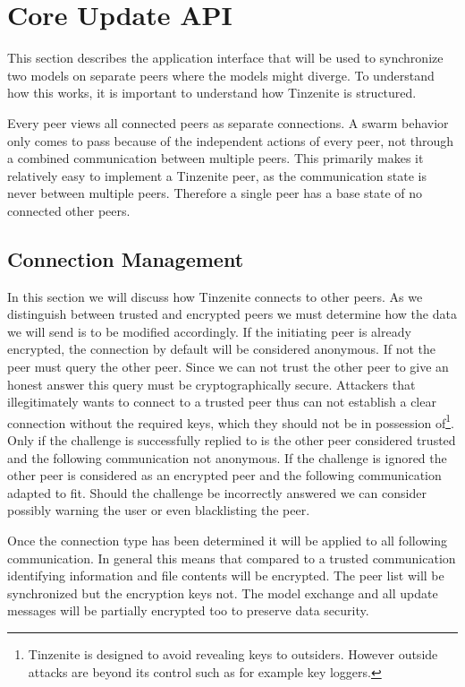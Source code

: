 \section{Core Update API}
\label{sec:Core Update API}

This section describes the application interface that will be used to synchronize two models on separate peers where the models might diverge.
To understand how this works, it is important to understand how Tinzenite is structured.

Every peer views all connected peers as separate connections.
A swarm behavior only comes to pass because of the independent actions of every peer, not through a combined communication between multiple peers.
This primarily makes it relatively easy to implement a Tinzenite peer, as the communication state is never between multiple peers.
Therefore a single peer has a base state of no connected other peers.

\subsection{Connection Management}
\label{sec:conn_management}

In this section we will discuss how Tinzenite connects to other peers.
As we distinguish between trusted and encrypted peers we must determine how the data we will send is to be modified accordingly.
If the initiating peer is already encrypted, the connection by default will be considered anonymous.
If not the peer must query the other peer.
Since we can not trust the other peer to give an honest answer this query must be cryptographically secure.
Attackers that illegitimately wants to connect to a trusted peer thus can not establish a clear connection without the required keys, which they should not be in possession of\footnote{Tinzenite is designed to avoid revealing keys to outsiders. However outside attacks are beyond its control such as for example key loggers.}.
Only if the challenge is successfully replied to is the other peer considered trusted and the following communication not anonymous.
If the challenge is ignored the other peer is considered as an encrypted peer and the following communication adapted to fit.
Should the challenge be incorrectly answered we can consider possibly warning the user or even blacklisting the peer.

Once the connection type has been determined it will be applied to all following communication.
In general this means that compared to a trusted communication identifying information and file contents will be encrypted.
The peer list will be synchronized but the encryption keys not.
The model exchange and all update messages will be partially encrypted too to preserve data security.

